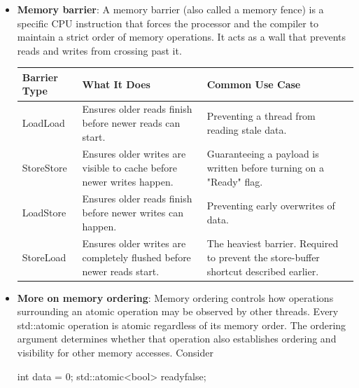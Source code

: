 \documentclass{report}
\begin{document}
\begin{itemize}
\begin{enumerate}
                \item Core 2 does the exact same thing simultaneously. It drops Write 1 to Y into its own Store Buffer and immediately executes Read X, which returns 0.
                \item Finally, both cores flush their Store Buffers out to the shared cache.
            \end{enumerate}
            To stop the CPU from doing this, you must use a Memory Barrier (like C++'s std::memory\_order\_seq\_cst). This instruction forces the CPU core to completely empty its local Store Buffer and commit the data to shared cache before it is allowed to perform the subsequent Read.
        \item \textbf{Memory barrier}:  A memory barrier (also called a memory fence) is a specific CPU instruction that forces the processor and the compiler to maintain a strict order of memory operations. It acts as a wall that prevents reads and writes from crossing past it.
            \begin{center}
                \begin{tabularx}{\textwidth}{@{}XXX@{}}
                    \toprule
                    \textbf{Barrier Type}& \textbf{What It Does}& \textbf{Common Use Case} \\
                    \midrule
                    LoadLoad & Ensures older reads finish before newer reads can start. & Preventing a thread from reading stale data. \\[2ex]
                    StoreStore &Ensures older writes are visible to cache before newer writes happen. &Guaranteeing a payload is written before turning on a "Ready" flag. \\[2ex]
                    LoadStore & Ensures older reads finish before newer writes can happen. &Preventing early overwrites of data. \\[2ex]
                    StoreLoad &Ensures older writes are completely flushed before newer reads start. & The heaviest barrier. Required to prevent the store-buffer shortcut described earlier. \\
                    \bottomrule
                \end{tabularx}
            \end{center}
        \item \textbf{More on memory ordering}: Memory ordering controls how operations surrounding an atomic operation may be observed by other threads.
            \bigbreak \noindent 
            Every std::atomic operation is atomic regardless of its memory order. The ordering argument determines whether that operation also establishes ordering and visibility for other memory accesses.
            \bigbreak \noindent 
            Consider
            \bigbreak \noindent 
            \begin{cppcode}
                int data = 0;
                std::atomic<bool> ready{false};


\end{cppcode}
\end{itemize}
\end{document}
